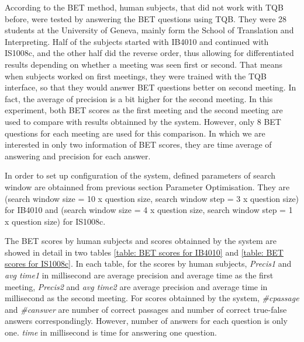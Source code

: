 \documentclass[10pt,a4paper]{article}
\numberwithin{algorithm}{section}  %
\begin{document}
According to the BET method, human subjects, that did not work with TQB before, were tested by answering the BET questions using TQB. They were 28 students at the University of Geneva, mainly form the School of Translation and Interpreting. Half of the subjects started with IB4010 and continued with IS1008c, and the other half did the reverse order, thus allowing for differentiated results depending on whether a meeting was seen first or second. That means when subjects worked on first meetings, they were trained with the TQB interface, so that they would answer BET questions better on second meeting. In fact, the average of precision is a bit higher for the second meeting. In this experiment, both BET scores as the first meeting and the second meeting are used to compare with results obtainned by the system. However, only 8 BET questions for each meeting are used for this comparison.  In which we are interested in only two information of BET scores, they are time average of answering and precision for each answer. 

In order to set up configuration of the system, defined parameters of search window are obtainned from previous section Parameter Optimisation. They are (search window size = 10 x question size, search window step = 3 x question size) for IB4010 and (search window size = 4 x question size, search window step = 1 x question size) for IS1008c.

The BET scores by human subjects and scores obtainned by the system are showed in detail in two tables \ref{table: BET scores for IB4010} and \ref{table: BET scores for IS1008c}. In each table, for the scores by human subjects, \textit{Precis1} and \textit{avg time1} in millisecond are average precision and average time as the first meeting, \textit{Precis2} and \textit{avg time2} are average precision and average time in millisecond as the second meeting. For scores obtainned by the system, \textit{\#cpassage} and \textit{\#canswer} are number of correct passages and number of correct true-false answers correspondingly. However, number of answers for each question is only one. \textit{time} in millisecond is time for answering one question.
\end{document}
